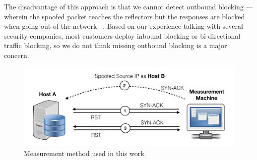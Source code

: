 The disadvantage of this approach is that we cannot detect outbound 
blocking — wherein the spoofed packet reaches the reflectors but 
the responses are blocked when going out of the network
~\cite{pearce2017augur}. Based on our experience talking with several 
security companies, most customers deploy inbound blocking or 
bi-directional traffic blocking, so we do not think missing outbound 
blocking is a major concern.

\begin{figure}[t]
\centering
\includegraphics[width=0.8\columnwidth]{data_usage/images/croped_method_new.pdf}
\caption{Measurement method used in this work.}
\label{fig:new_method}
\end{figure}